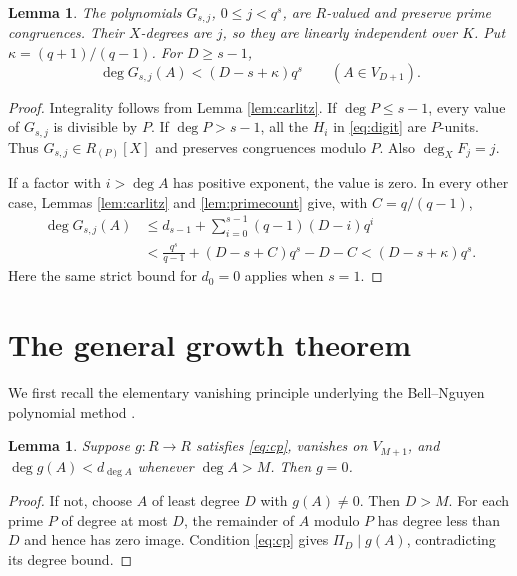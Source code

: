 \documentclass[11pt]{article}
\newtheorem{lemma}[theorem]{Lemma}
\begin{document}
\begin{lemma}\label{lem:digit}
The polynomials $G_{s,j}$, $0\le j<q^s$, are $R$-valued and preserve
prime congruences. Their $X$-degrees are $j$, so they are linearly
independent over $K$. Put $\kappa=(q+1)/(q-1)$. For $D\ge s-1$,
\begin{equation}\label{eq:digitheight}
 \deg G_{s,j}(A)<(D-s+\kappa)q^s
 \qquad(A\in V_{D+1}).
\end{equation}
\end{lemma}
\begin{proof}
Integrality follows from Lemma \ref{lem:carlitz}. If $\deg P\le s-1$,
every value of $G_{s,j}$ is divisible by $P$. If $\deg P>s-1$, all the
$H_i$ in \eqref{eq:digit} are $P$-units. Thus $G_{s,j}\in R_{(P)}[X]$
and preserves congruences modulo $P$. Also $\deg_X F_j=j$.

If a factor with $i>\deg A$ has positive exponent, the value is zero.
In every other case, Lemmas \ref{lem:carlitz} and \ref{lem:primecount}
give, with $C=q/(q-1)$,
\begin{align*}
 \deg G_{s,j}(A)
 &\le d_{s-1}+\sum_{i=0}^{s-1}(q-1)(D-i)q^i\\
 &<\frac{q^s}{q-1}+(D-s+C)q^s-D-C
 <(D-s+\kappa)q^s.
\end{align*}
Here the same strict bound for $d_0=0$ applies when $s=1$.
\end{proof}

\section{The general growth theorem}
We first recall the elementary vanishing principle underlying the
Bell--Nguyen polynomial method \cite[Lemma 2.1]{BN}.

\begin{lemma}\label{lem:vanishing}
Suppose $g:R\to R$ satisfies \eqref{eq:cp}, vanishes on $V_{M+1}$, and
$\deg g(A)<d_{\deg A}$ whenever $\deg A>M$. Then $g=0$.
\end{lemma}
\begin{proof}
If not, choose $A$ of least degree $D$ with $g(A)\ne0$. Then $D>M$.
For each prime $P$ of degree at most $D$, the remainder of $A$ modulo
$P$ has degree less than $D$ and hence has zero image. Condition
\eqref{eq:cp} gives $\Pi_D\mid g(A)$, contradicting its degree bound.
\end{proof}
\end{document}
